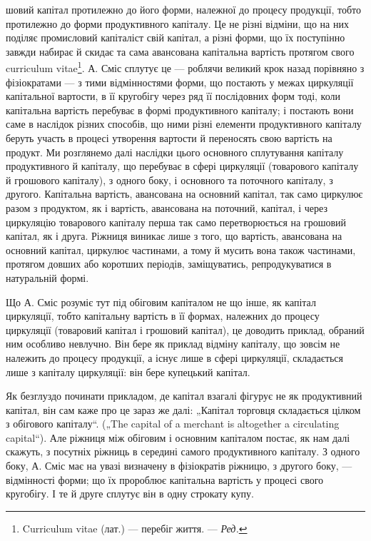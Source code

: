 \parcont{}  %
шовий капітал протилежно до його форми, належної до процесу продукції,
тобто протилежно до форми продуктивного капіталу. Це не різні
відміни, що на них поділяє промисловий капіталіст свій капітал, а різні
форми, що їх поступінно завжди набирає й скидає та сама авансована
капітальна вартість протягом свого curriculum vitae\footnote*{
Curriculum vitae (лат.) — перебіг життя. — \emph{Ред.}
}. А. Сміс сплутує це —
роблячи великий крок назад порівняно з фізіократами — з тими відмінностями
форми, що постають у межах циркуляції капітальної вартости, в її кругобігу
через ряд її послідовних форм тоді, коли капітальна вартість перебуває
в формі продуктивного капіталу; і постають вони саме в наслідок
різних способів, що ними різні елементи продуктивного капіталу беруть
участь в процесі утворення вартости й переносять свою вартість на продукт.
Ми розглянемо далі наслідки цього основного сплутування капіталу
продуктивного й капіталу, що перебуває в сфері циркуляції (товарового
капіталу й грошового капіталу), з одного боку, і основного та поточного
капіталу, з другого. Капітальна вартість, авансована на основний капітал,
так само циркулює разом з продуктом, як і вартість, авансована на поточний,
капітал, і через циркуляцію товарового капіталу перша так само перетворюється
на грошовий капітал, як і друга. Ріжниця виникає лише з того,
що вартість, авансована на основний капітал, циркулює частинами, а тому
й мусить вона також частинами, протягом довших або коротших періодів,
заміщуватись, репродукуватися в натуральній формі.

Що А. Сміс розуміє тут під обіговим капіталом не що інше, як капітал
циркуляції, тобто капітальну вартість в її формах, належних до процесу
циркуляції (товаровий капітал і грошовий капітал), це доводить приклад,
обраний ним особливо невлучно. Він бере як приклад відміну капіталу, що
зовсім не належить до процесу продукції, а існує лише в сфері циркуляції,
складається лише з капіталу циркуляції: він бере купецький капітал.

Як безглуздо починати прикладом, де капітал взагалі фігурує не як
продуктивний капітал, він сам каже про це зараз же далі: „Капітал торговця
складається цілком з обігового капіталу“. („The capital of a merchant
is altogether a circulating capital“). Але ріжниця між обіговим і основним
капіталом постає, як нам далі скажуть, з посутніх ріжниць в середині
самого продуктивного капіталу. З одного боку, А. Сміс має на
увазі визначену в фізіократів ріжницю, з другого боку, — відмінності форми;
що їх пророблює капітальна вартість у процесі свого кругобігу. І те
й друге сплутує він в одну строкату купу.

